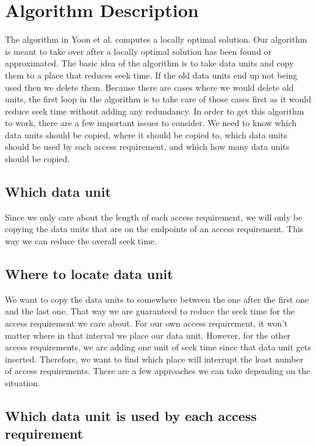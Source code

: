 \documentclass[11pt,psfig]{article}
\begin{document}
\section*{Algorithm Description}

The algorithm in Yoon et al. computes a locally optimal solution. Our algorithm is meant to take over after a locally optimal solution has been found or approximated. The basic idea of the algorithm is to take data units and copy them to a place that reduces seek time. If the old data units end up not being used then we delete them. Because there are cases where we would delete old units, the first loop in the algorithm is to take care of those cases first as it would reduce seek time without adding any redundancy. In order to get this algorithm to work, there are a few important issues to consider. We need to know which data units should be copied, where it should be copied to, which data units should be used by each access requirement, and which how many data units should be copied. 

\subsection*{Which data unit}

Since we only care about the length of each access requirement, we will only be copying the data units that are on the endpoints of an access requirement. This way we can reduce the overall seek time.

\subsection*{Where to locate data unit}

We want to copy the data units to somewhere between the one after the first one and the last one. That way we are guaranteed to reduce the seek time for the access requirement we care about. For our own access requirement, it won't matter where in that interval we place our data unit. However, for the other access requirements, we are adding one unit of seek time since that data unit gets inserted. Therefore, we want to find which place will interrupt the least number of access requirements. There are a few approaches we can take depending on the situation. 

\subsection*{Which data unit is used by each access requirement}
\end{document}
